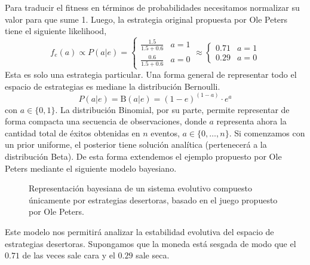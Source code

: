 \documentclass[a4paper,10pt]{article}
\begin{document}
Para traducir el fitness en términos de probabilidades necesitamos normalizar su valor para que sume 1.
Luego, la estrategia original propuesta por Ole Peters tiene el siguiente likelihood,
%
\begin{equation}
f_e(a) \propto  P(a|e) = \begin{cases}
 \frac{1.5}{1.5+0.6} & a = 1 \\
 \frac{0.6}{1.5+0.6} & a = 0
  \end{cases}
  \approx
\begin{cases}
 0.71 & a= 1 \\
 0.29 & a= 0
\end{cases}
\end{equation}
%
Esta es solo una estrategia particular.
Una forma general de representar todo el espacio de estrategias es mediane la distribución Bernoulli.
%
\begin{equation}
P(a|e) = \text{B}(a|e) = (1-e)^{(1-a)} \cdot e^a 
\end{equation}
%
con $a \in \{0,1\}$.
La distribución Binomial, por su parte, permite representar de forma compacta una secuencia de observaciones, donde $a$ representa ahora la cantidad total de éxitos obtenidas en $n$ eventos, $a \in \{0, \dots, n\}$.
Si comenzamos con un prior uniforme, el posterior tiene solución analítica (pertenecerá a la distribución Beta).
De esta forma extendemos el ejemplo propuesto por Ole Peters mediante el siguiente modelo bayesiano.
%
\begin{figure}[H]
\centering
{}
\caption{Representación bayesiana de un sistema evolutivo compuesto únicamente por estrategias desertoras, basado en el juego propuesto por Ole Peters.}
\label{fig:modelo_beta_binomial}
\end{figure}
%
Este modelo nos permitirá analizar la estabilidad evolutiva del espacio de estrategias desertoras. 
Supongamos que la moneda está sesgada de modo que el $0.71$ de las veces sale cara y el $0.29$ sale seca.
\end{document}
